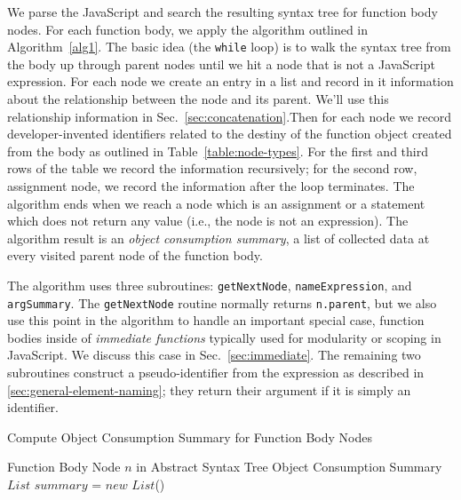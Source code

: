 \documentclass[10pt, preprint]{sigplanconf}
\begin{document}
{We parse the JavaScript and search the resulting syntax tree for function body nodes. For each function body, we apply the algorithm outlined in Algorithm~\ref{alg1}. The basic idea (the \verb|while| loop) is to walk the syntax tree from the body up through parent nodes until we hit a node that is not a JavaScript expression. For each node we create an entry in a list and record in it information about the relationship between the node and its parent. We'll use this relationship information in Sec.~\ref{sec:concatenation}.Then for each node  we record developer-invented identifiers related to the destiny of the function object created from the body as outlined in  Table~\ref{table:node-types}. For the first and third rows of the table we record the information recursively; for the second row,  assignment node, we record the information after the loop terminates.   The algorithm ends when we reach a node which is an assignment or a statement which does not return any value (i.e., the node is not an expression).  The algorithm result is an \textit{object consumption summary}, a list of collected data at every visited parent node of the function body.

The algorithm uses three subroutines: \verb|getNextNode|,  \verb|nameExpression|, and \verb|argSummary|. The \verb|getNextNode| routine normally returns \verb|n.parent|, but we also use this point in the algorithm to handle an important special case, function bodies inside of \textit{immediate functions} typically used for modularity or scoping in JavaScript. We discuss this case in Sec.~\ref{sec:immediate}. The remaining two subroutines construct a pseudo-identifier from the expression as described in \ref{sec:general-element-naming}; they return their argument if it is simply an identifier.  


\renewcommand{\algorithmicrequire}{\textbf{Input:}}
\renewcommand{\algorithmicensure}{\textbf{Output:}}

\begin{algorithm}                      %
\caption{Compute Object Consumption Summary for Function Body Nodes}          %
\label{alg1}                           %
\begin{algorithmic}                    %
\REQUIRE Function Body Node $n$ in Abstract Syntax Tree
\ENSURE Object Consumption Summary 
\STATE $List$ $summary$ = $new$ $List$()



\end{algorithmic}
\end{algorithm}}
\end{document}
